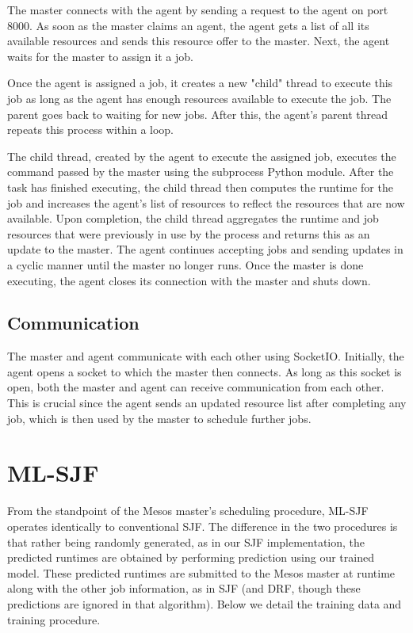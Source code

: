 \documentclass{hotnets19}
\begin{document}
The master connects with the agent by sending a request to the agent on port 8000. As soon as the master claims an agent, the agent gets a list of all its available resources and sends this resource offer to the master. Next, the agent waits for the master to assign it a job. 

Once the agent is assigned a job, it creates a new "child" thread to execute this job as long as the agent has enough resources available to execute the job. The parent goes back to waiting for new jobs. After this, the agent's parent thread repeats this process within a loop. 

The child thread, created by the agent to execute the assigned job, executes the command passed by the master using the subprocess Python module. After the task has finished executing, the child thread then computes the runtime for the job and increases the agent's list of resources to reflect the resources that are now available. Upon completion, the child thread aggregates the runtime and job resources that were previously in use by the process and returns this as an update to the master.
The agent continues accepting jobs and sending updates in a cyclic manner until the master no longer runs. Once the master is done executing, the agent closes its connection with the master and shuts down.

\subsection{Communication}

The master and agent communicate with each other using SocketIO.
Initially, the agent opens a socket to which the master then connects.
As long as this socket is open, both the master and agent can receive communication from each other.
This is crucial since the agent sends an updated resource list after completing any job, which is then used by the master to schedule further jobs.

\section{ML-SJF}
From the standpoint of the Mesos master's scheduling procedure, ML-SJF operates identically to conventional SJF. The difference in the two procedures is that rather being randomly generated, as in our SJF implementation, the predicted runtimes are obtained by performing prediction using our trained model. These predicted runtimes are submitted to the Mesos master at runtime along with the other job information, as in SJF (and DRF, though these predictions are ignored in that algorithm). Below we detail the training data and training procedure.
\end{document}
